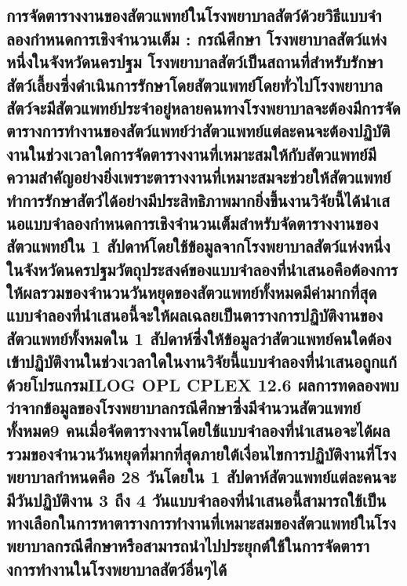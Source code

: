 \hspace{0cm}\subsection{การจัดตารางงานของสัตวแพทย์ในโรงพยาบาลสัตว์ด้วยวิธีแบบจําลองกําหนดการเชิงจํานวนเต็ม : กรณีศึกษา โรงพยาบาลสัตว์แห่งหนึ่งในจังหวัดนครปฐม โรงพยาบาลสัตว์เป็นสถานที่สําหรับรักษาสัตว์เลี้ยงซึ่งดําเนินการรักษาโดยสัตวแพทย์โดยทั่วไปโรงพยาบาลสัตว์จะมีสัตวแพทย์ประจําอยู่หลายคนทางโรงพยาบาลจะต้องมีการจัดตารางการทํางานของสัตว์แพทย์ว่าสัตวแพทย์แต่ละคนจะต้องปฏิบัติงานในช่วงเวลาใดการจัดตารางงานที่เหมาะสมให้กับสัตวแพทย์มีความสําคัญอย่างยิ่งเพราะตารางงานที่เหมาะสมจะช่วยให้สัตวแพทย์ทําการรักษาสัตว์ได้อย่างมีประสิทธิภาพมากยิ่งขึ้นงานวิจัยนี้ได้นําเสนอแบบจําลองกําหนดการเชิงจํานวนเต็มสําหรับจัดตารางงานของสัตวแพทย์ใน 1 สัปดาห์โดยใช้ข้อมูลจากโรงพยาบาลสัตว์แห่งหนึ่งในจังหวัดนครปฐมวัตถุประสงค์ของแบบจําลองที่นําเสนอคือต้องการให้ผลรวมของจํานวนวันหยุดของสัตวแพทย์ทั้งหมดมีค่ามากที่สุดแบบจําลองที่นําเสนอนี้จะให้ผลเฉลยเป็นตารางการปฏิบัติงานของสัตวแพทย์ทั้งหมดใน 1 สัปดาห์ซึ่งให้ข้อมูลว่าสัตวแพทย์คนใดต้องเข้าปฏิบัติงานในช่วงเวลาใดในงานวิจัยนี้แบบจําลองที่นําเสนอถูกแก้ด้วยโปรแกรมILOG OPL CPLEX 12.6 ผลการทดลองพบว่าจากข้อมูลของโรงพยาบาลกรณีศึกษาซึ่งมีจํานวนสัตวแพทย์ทั้งหมด9 คนเมื่อจัดตารางงานโดยใช้แบบจําลองที่นําเสนอจะได้ผลรวมของจํานวนวันหยุดที่มากที่สุดภายใต้เงื่อนไขการปฏิบัติงานที่โรงพยาบาลกําหนดคือ 28 วันโดยใน 1 สัปดาห์สัตวแพทย์แต่ละคนจะมีวันปฏิบัติงาน 3 ถึง 4 วันแบบจําลองที่นําเสนอนี้สามารถใช้เป็นทางเลือกในการหาตารางการทํางานที่เหมาะสมของสัตวแพทย์ในโรงพยาบาลกรณีศึกษาหรือสามารถนําไปประยุกต์ใช้ในการจัดตารางการทํางานในโรงพยาบาลสัตว์อื่นๆได้ \cite{vijai4}}

